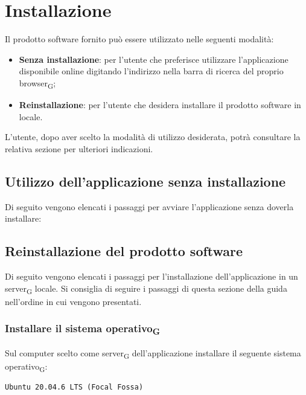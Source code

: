 \section{Installazione}
Il prodotto software fornito può essere utilizzato nelle seguenti modalità:
\begin{itemize}
	\item \textbf{Senza installazione}: per l'utente che preferisce utilizzare l'applicazione disponibile online digitando l'indirizzo nella barra di ricerca del proprio browser\textsubscript{G};
	\item \textbf{Reinstallazione}: per l'utente che desidera installare il prodotto software in locale.
\end{itemize}    
L'utente, dopo aver scelto la modalità di utilizzo desiderata, potrà consultare la relativa sezione per ulteriori indicazioni.

\subsection{Utilizzo dell'applicazione senza installazione}
Di seguito vengono elencati i passaggi per avviare l'applicazione senza doverla installare:

\subsection{Reinstallazione del prodotto software}
Di seguito vengono elencati i passaggi per l'installazione dell'applicazione in un server\textsubscript{G} locale. Si consiglia di seguire i passaggi di questa sezione della guida nell'ordine in cui vengono presentati.

\subsubsection{Installare il sistema operativo\textsubscript{G}}
Sul computer scelto come server\textsubscript{G} dell'applicazione installare il seguente sistema operativo\textsubscript{G}:
\begin{verbatim}
Ubuntu 20.04.6 LTS (Focal Fossa)
\end{verbatim} \\

